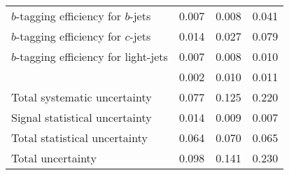\begin{table}[htb]
\begin{center}
\begin{tabular}{l c c c}
    $b$-tagging efficiency for $b$-jets  	   &	0.007	&	0.008	&	0.041	\\
    $b$-tagging efficiency for $c$-jets        &	0.014	&	0.027	&	0.079	\\
    $b$-tagging efficiency for light-jets      &	0.007	&	0.008	&	0.010	\\
    \MET	                                   &	0.002	&	0.010	&	0.011	\\
    \midrule
    Total systematic uncertainty        	   &	0.077	&	0.125	&	0.220	\\
    \midrule
    Signal statistical uncertainty	           &	0.014	&	0.009	&	0.007	\\
    \midrule
    Total statistical uncertainty	           &	0.064	&	0.070	&	0.065	\\
    \midrule \midrule
    Total uncertainty           	           &	0.098	&	0.141	&	0.230	\\
    \bottomrule \bottomrule
  \end{tabular}
  \end{center}
  \label{tqX:rankingbreakuX}
  \end{table}

